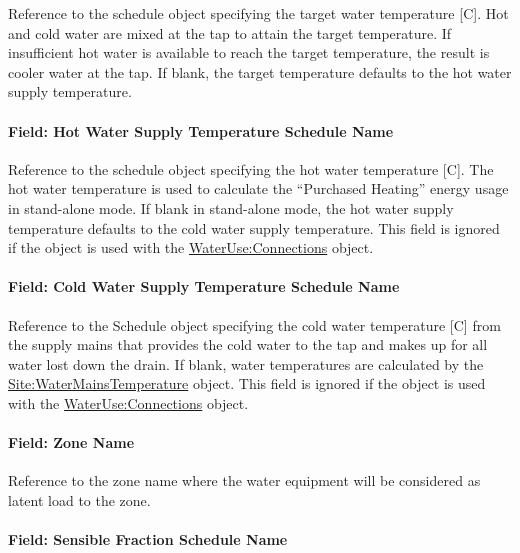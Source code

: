 Reference to the schedule object specifying the target water temperature {[}C{]}. Hot and cold water are mixed at the tap to attain the target temperature. If insufficient hot water is available to reach the target temperature, the result is cooler water at the tap. If blank, the target temperature defaults to the hot water supply temperature.

\paragraph{Field: Hot Water Supply Temperature Schedule Name}\label{field-hot-water-supply-temperature-schedule-name}

Reference to the schedule object specifying the hot water temperature {[}C{]}. The hot water temperature is used to calculate the ``Purchased Heating'' energy usage in stand-alone mode. If blank in stand-alone mode, the hot water supply temperature defaults to the cold water supply temperature. This field is ignored if the object is used with the \hyperref[wateruseconnections]{WaterUse:Connections} object.

\paragraph{Field: Cold Water Supply Temperature Schedule Name}\label{field-cold-water-supply-temperature-schedule-name-000}

Reference to the Schedule object specifying the cold water temperature {[}C{]} from the supply mains that provides the cold water to the tap and makes up for all water lost down the drain. If blank, water temperatures are calculated by the \hyperref[sitewatermainstemperature]{Site:WaterMainsTemperature} object. This field is ignored if the object is used with the \hyperref[wateruseconnections]{WaterUse:Connections} object.

\paragraph{Field: Zone Name}\label{field-zone-name-013}

Reference to the zone name where the water equipment will be considered as latent load to the zone.

\paragraph{Field: Sensible Fraction Schedule Name}\label{field-sensible-fraction-schedule-name}

